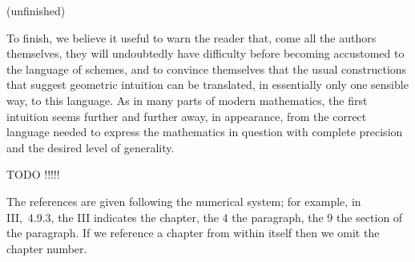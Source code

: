 \documentclass[../main.tex]{subfiles}
\begin{document}
\asttri

(unfinished)

\asttri

To finish, we believe it useful to warn the reader that, come all the authors themselves, they will undoubtedly have difficulty before becoming accustomed to the language of schemes, and to convince themselves that the usual constructions that suggest geometric intuition can be translated, in essentially only one sensible way, to this language.
As in many parts of modern mathematics, the first intuition seems further and further away, in appearance, from the correct language needed to express the mathematics in question with complete precision and the desired level of generality.

TODO !!!!!


\asttri

The references are given following the numerical system; for example, in III,~4.9.3, the III indicates the chapter, the 4 the paragraph, the 9 the section of the paragraph.
If we reference a chapter from within itself then we omit the chapter number.
\end{document}
